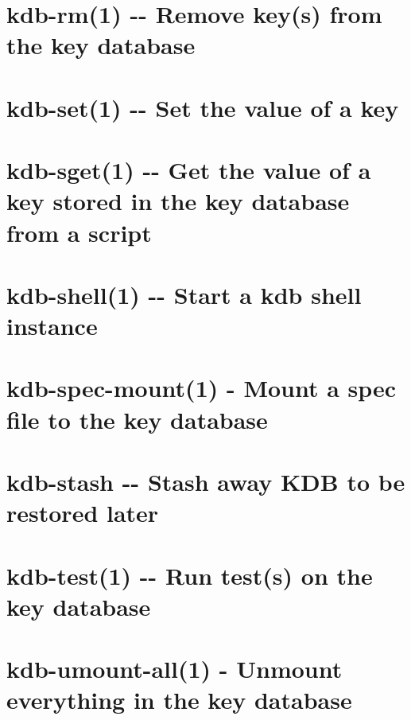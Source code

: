 \documentclass[twoside]{book}
\newcommand{\+}{\discretionary{\mbox{\scriptsize$\hookleftarrow$}}{}{}}
\begin{document}
\chapter{kdb-\/rm(1) -\/-\/ Remove key(s) from the key database}
\label{doc_help_kdb-rm_md}

\chapter{kdb-\/set(1) -\/-\/ Set the value of a key}
\label{doc_help_kdb-set_md}

\chapter{kdb-\/sget(1) -\/-\/ Get the value of a key stored in the key database from a script}
\label{doc_help_kdb-sget_md}

\chapter{kdb-\/shell(1) -\/-\/ Start a kdb shell instance}
\label{doc_help_kdb-shell_md}

\chapter{kdb-\/spec-\/mount(1) -\/ Mount a spec file to the key database}
\label{doc_help_kdb-spec-mount_md}

\chapter{kdb-\/stash -\/-\/ Stash away K\+DB to be restored later}
\label{doc_help_kdb-stash_md}

\chapter{kdb-\/test(1) -\/-\/ Run test(s) on the key database}
\label{doc_help_kdb-test_md}

\chapter{kdb-\/umount-\/all(1) -\/ Unmount everything in the key database}
\label{doc_help_kdb-umount-all_md}

\end{document}
